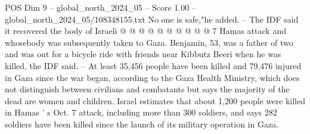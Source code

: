 \begin{textsample}{POS Dim 9 – global\_north\_2024\_05 – Score 1.00 – global\_north\_2024\_05/108348155.txt}
No one is safe,"he added. -- The IDF said it recovered the body of Israeli @ @ @ @ @ @ @ @ @ @ 7 Hamas attack and whosebody was subsequently taken to Gaza.
Benjamin, 53, was a father of two and was out for a bicycle ride with friends near Kibbutz Beeri when he was killed, the IDF said. -- At least 35,456 people have been killed and 79,476 injured in Gaza since the war began, according to the Gaza Health Ministry, which does not distinguish between civilians and combatants but says the majority of the dead are women and children.
Israel estimates that about 1,200 people were killed in Hamas ' s Oct. 7 attack, including more than 300 soldiers, and says 282 soldiers have been killed since the launch of its military operation in Gaza.

\end{textsample}
